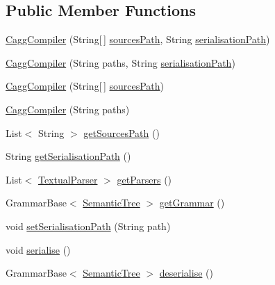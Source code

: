 \subsection*{Public Member Functions}
\begin{DoxyCompactItemize}
\item 
\hyperlink{classit_1_1emarolab_1_1cagg_1_1interfaces_1_1CaggCompiler_ab895a9e8e2cc700363ebad74162e56f2}{Cagg\-Compiler} (String\mbox{[}$\,$\mbox{]} \hyperlink{classit_1_1emarolab_1_1cagg_1_1interfaces_1_1CaggCompiler_aaf15dc18fa5f445c633ccd5918e236ed}{sources\-Path}, String \hyperlink{classit_1_1emarolab_1_1cagg_1_1interfaces_1_1CaggCompiler_adff370ab0237bd5b87746bb838cee15f}{serialisation\-Path})
\item 
\hyperlink{classit_1_1emarolab_1_1cagg_1_1interfaces_1_1CaggCompiler_a7812d39177e27604633a6f39b5c5cbc1}{Cagg\-Compiler} (String paths, String \hyperlink{classit_1_1emarolab_1_1cagg_1_1interfaces_1_1CaggCompiler_adff370ab0237bd5b87746bb838cee15f}{serialisation\-Path})
\item 
\hyperlink{classit_1_1emarolab_1_1cagg_1_1interfaces_1_1CaggCompiler_aa224fe2a5920e84814c1600b96ea281c}{Cagg\-Compiler} (String\mbox{[}$\,$\mbox{]} \hyperlink{classit_1_1emarolab_1_1cagg_1_1interfaces_1_1CaggCompiler_aaf15dc18fa5f445c633ccd5918e236ed}{sources\-Path})
\item 
\hyperlink{classit_1_1emarolab_1_1cagg_1_1interfaces_1_1CaggCompiler_ae7667f62cba9617ebe4f2732497dd1fc}{Cagg\-Compiler} (String paths)
\item 
List$<$ String $>$ \hyperlink{classit_1_1emarolab_1_1cagg_1_1interfaces_1_1CaggCompiler_aa47e08bec4d58d6d9fab9a69cad695da}{get\-Sources\-Path} ()
\item 
String \hyperlink{classit_1_1emarolab_1_1cagg_1_1interfaces_1_1CaggCompiler_a55f5ea8d212337b97f3a711c96e06888}{get\-Serialisation\-Path} ()
\item 
List$<$ \hyperlink{classit_1_1emarolab_1_1cagg_1_1core_1_1language_1_1parser_1_1TextualParser}{Textual\-Parser} $>$ \hyperlink{classit_1_1emarolab_1_1cagg_1_1interfaces_1_1CaggCompiler_aab0f4da433bf18e4179cc6a6131708ab}{get\-Parsers} ()
\item 
Grammar\-Base$<$ \hyperlink{classit_1_1emarolab_1_1cagg_1_1core_1_1evaluation_1_1semanticGrammar_1_1SemanticTree}{Semantic\-Tree} $>$ \hyperlink{classit_1_1emarolab_1_1cagg_1_1interfaces_1_1CaggCompiler_a0719d5b86bea7dd56e3ee338d5126574}{get\-Grammar} ()
\item 
void \hyperlink{classit_1_1emarolab_1_1cagg_1_1interfaces_1_1CaggCompiler_af1c54ddc24fa3572776b4043429ef6ee}{set\-Serialisation\-Path} (String path)
\item 
void \hyperlink{classit_1_1emarolab_1_1cagg_1_1interfaces_1_1CaggCompiler_a1bc38fef4b3c861f8a06660743ed3d7a}{serialise} ()
\item 
Grammar\-Base$<$ \hyperlink{classit_1_1emarolab_1_1cagg_1_1core_1_1evaluation_1_1semanticGrammar_1_1SemanticTree}{Semantic\-Tree} $>$ \hyperlink{classit_1_1emarolab_1_1cagg_1_1interfaces_1_1CaggCompiler_ad08b589a78f424243a59c6513777d54d}{deserialise} ()
\end{DoxyCompactItemize}
